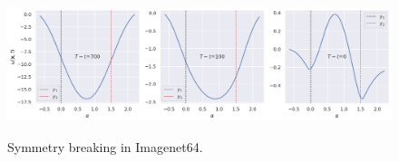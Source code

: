 \begin{figure}[ht!]
\centering
\begin{minipage}[b]{.368\textwidth}
\end{minipage}%
\begin{minipage}[b]{.625\textwidth}
\centering
{} %
\subfloat
  {\includegraphics[width=\textwidth]{figs/plots/potentials_imagenet64_avg_20.png}}\vfill
\addtocounter{subfigure}{-2}
\end{minipage}
\vspace{-0.1cm}
\caption{Symmetry breaking in Imagenet64.}
\label{fig:potentials_imagenet64}
\end{figure}

